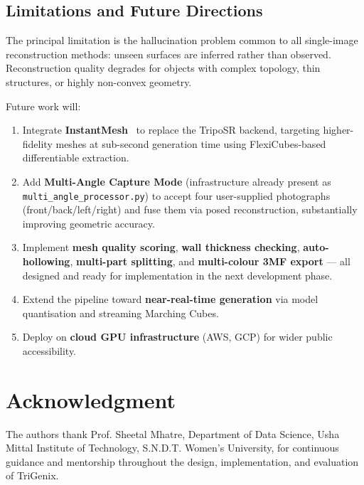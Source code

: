 ﻿\documentclass[conference]{IEEEtran}
\begin{document}


\subsection{Limitations and Future Directions}%

The principal limitation is the hallucination problem common to all single-image reconstruction methods:
unseen surfaces are inferred rather than observed. Reconstruction quality degrades for objects with complex
topology, thin structures, or highly non-convex geometry.

Future work will:
\begin{enumerate}
  \item Integrate \textbf{InstantMesh}~\cite{instantmesh} to replace the TripoSR backend, targeting
        higher-fidelity meshes at sub-second generation time using FlexiCubes-based differentiable extraction.
  \item Add \textbf{Multi-Angle Capture Mode} (infrastructure already present as \texttt{multi\_angle\_processor.py})
        to accept four user-supplied photographs (front/back/left/right) and fuse them via posed reconstruction,
        substantially improving geometric accuracy.
  \item Implement \textbf{mesh quality scoring}, \textbf{wall thickness checking}, \textbf{auto-hollowing},
        \textbf{multi-part splitting}, and \textbf{multi-colour 3MF export} — all designed and ready for
        implementation in the next development phase.
  \item Extend the pipeline toward \textbf{near-real-time generation} via model quantisation and streaming
        Marching Cubes.
  \item Deploy on \textbf{cloud GPU infrastructure} (AWS, GCP) for wider public accessibility.
\end{enumerate}


\section*{Acknowledgment}

The authors thank Prof. Sheetal Mhatre, Department of Data Science, Usha Mittal Institute of Technology,
S.N.D.T. Women's University, for continuous guidance and mentorship throughout the design, implementation,
and evaluation of TriGenix.
\end{document}
